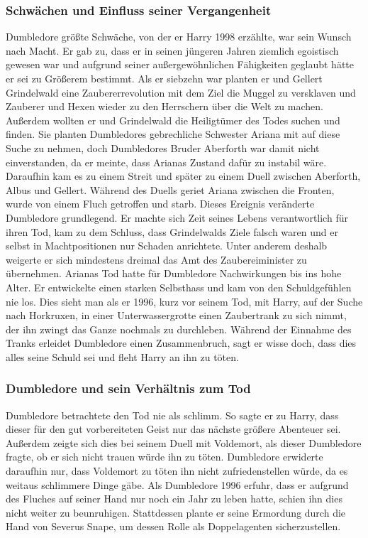\documentclass[a4paper, 10pt]{article}
\begin{document}
\subsubsection*{\large Schwächen und Einfluss seiner Vergangenheit}
Dumbledore größte Schwäche, von der er Harry 1998 erzählte, war sein Wunsch nach Macht. Er gab zu, dass er in seinen jüngeren Jahren ziemlich egoistisch gewesen war und aufgrund seiner außergewöhnlichen Fähigkeiten geglaubt hätte er sei zu Größerem bestimmt. Als er siebzehn war planten er und Gellert Grindelwald eine Zaubererrevolution mit dem Ziel die Muggel zu versklaven und Zauberer und Hexen wieder zu den Herrschern über die Welt zu machen. Außerdem wollten er und Grindelwald die Heiligtümer des Todes suchen und finden. Sie planten Dumbledores gebrechliche Schwester Ariana mit auf diese
Suche zu nehmen, doch Dumbledores Bruder Aberforth war damit nicht einverstanden, da er meinte, dass Arianas Zustand dafür zu instabil wäre. Daraufhin kam es zu einem Streit und später zu einem Duell zwischen Aberforth, Albus und Gellert. Während des Duells geriet Ariana zwischen die Fronten, wurde von einem Fluch getroffen und starb. Dieses Ereignis veränderte Dumbledore grundlegend. Er machte sich Zeit seines Lebens verantwortlich für ihren Tod, kam zu dem Schluss, dass Grindelwalds Ziele falsch waren und er selbst in Machtpositionen nur Schaden anrichtete. Unter anderem deshalb weigerte er sich mindestens dreimal das Amt des Zaubereiminister zu übernehmen.
\vspace{10pt}
\newline
Arianas Tod hatte für Dumbledore Nachwirkungen bis ins hohe Alter. Er entwickelte einen starken Selbsthass und kam von den Schuldgefühlen nie los. Dies sieht man als er 1996, kurz vor seinem Tod, mit Harry, auf der Suche nach Horkruxen, in einer Unterwassergrotte einen Zaubertrank zu sich nimmt, der ihn zwingt das Ganze nochmals zu durchleben. Während der Einnahme des Tranks erleidet Dumbledore einen Zusammenbruch, sagt er wisse doch, dass dies alles seine Schuld sei und fleht Harry an ihn zu töten.
\subsubsection*{\large Dumbledore und sein Verhältnis zum Tod}
Dumbledore betrachtete den Tod nie als schlimm. So sagte er zu Harry, dass dieser für den gut vorbereiteten Geist nur das nächste größere Abenteuer sei. Außerdem zeigte sich dies bei seinem Duell mit Voldemort, als dieser Dumbledore fragte, ob er sich nicht trauen würde ihn zu töten. Dumbledore erwiderte daraufhin nur, dass Voldemort zu töten ihn nicht zufriedenstellen würde, da es weitaus schlimmere Dinge gäbe. Als Dumbledore 1996 erfuhr, dass er aufgrund des Fluches auf seiner Hand nur noch ein Jahr zu leben hatte, schien ihn dies nicht weiter zu beunruhigen. Stattdessen plante er seine Ermordung durch die Hand von Severus Snape, um dessen Rolle als Doppelagenten sicherzustellen.
\end{document}
